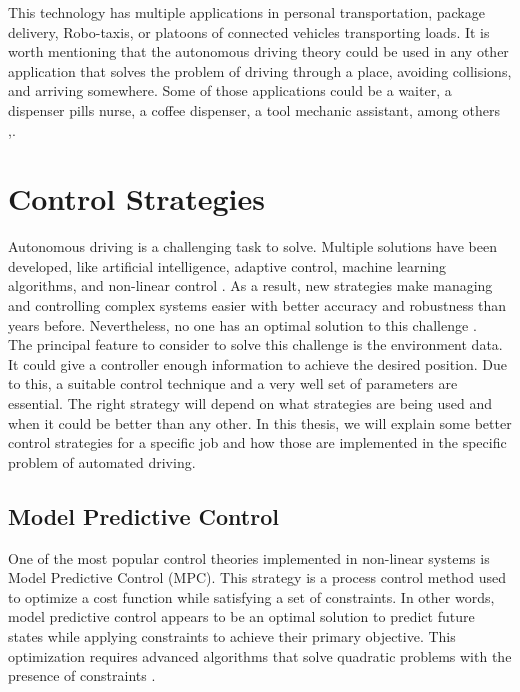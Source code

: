 This technology has multiple applications in personal transportation, package delivery, Robo-taxis, or platoons of connected vehicles transporting loads. It is worth mentioning that the autonomous driving theory could be used in any other application that solves the problem of
driving through a place, avoiding collisions, and arriving somewhere. Some of those applications could be a waiter, a dispenser pills nurse, a coffee dispenser, a tool mechanic assistant,
among others \cite{8957499},\cite{peter}.


\section{Control Strategies}
Autonomous driving is a challenging task to solve. Multiple solutions have been developed, like artificial intelligence, adaptive control, machine learning algorithms, and non-linear control \cite{1t_network, 2t_centraliz}. As a result, new strategies make managing and controlling complex systems easier with better accuracy and robustness than years before. Nevertheless, no one has an optimal solution to this challenge \cite{506394}.
\\

The principal feature to consider to solve this challenge is the environment data. It could give a controller enough information to achieve the desired position. Due to this, a suitable control technique and a very well set of parameters are essential. The right strategy will depend on what strategies are being used and when it could be better than any other. In this thesis, we will explain some better control strategies for a specific job and how those are implemented in the specific problem of automated driving.


\subsection{Model Predictive Control}
One of the most popular control theories implemented in non-linear systems is Model Predictive Control (MPC). This strategy is a process control method used to optimize a cost function while satisfying a set of constraints. In other words, model predictive control appears to be an optimal solution to predict future states while applying constraints to achieve their primary objective. This optimization requires advanced algorithms that solve quadratic problems with the presence of constraints \cite{GARCIA1989335}.
\\

